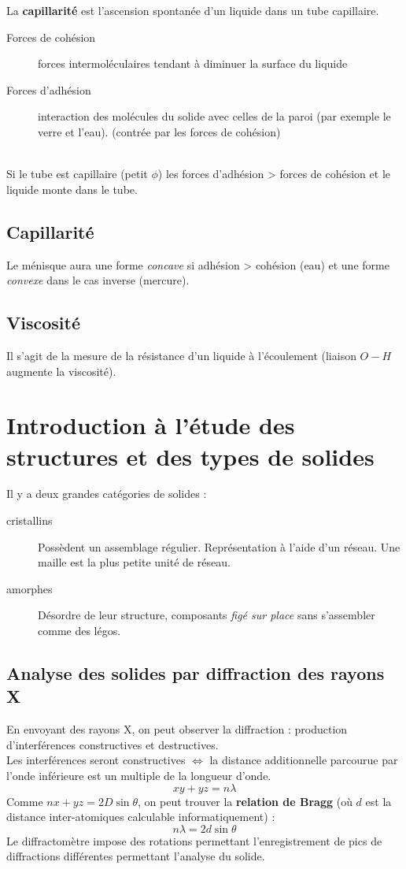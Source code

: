 \documentclass[british,french,11pt, a4paper, openany]{book}
\begin{document}
	La \textbf{capillarité} est l'ascension spontanée d'un liquide dans un tube capillaire.
	\begin{description}
		\item[Forces de cohésion] forces intermoléculaires tendant à diminuer la surface du liquide
		\item[Forces d'adhésion] interaction des molécules du solide avec celles de la paroi (par exemple le verre et l'eau). (contrée par les forces de cohésion)
	\end{description}
	\ \\
	Si le tube est capillaire (petit $\phi$) les forces d'adhésion > forces de cohésion et le liquide monte dans le tube.
	
	\subsection*{Capillarité}
	Le ménisque aura une forme \textit{concave} si adhésion > cohésion (eau) et une forme \textit{convexe} dans le cas inverse (mercure).
	
	\subsection*{Viscosité}
	Il s'agit de la mesure de la résistance d'un liquide à l'écoulement (liaison $O-H$ augmente la viscosité).
	
	\section{Introduction à l'étude des structures et des types de solides}
	Il y a deux grandes catégories de solides : 
	\begin{description}
		\item[cristallins] Possèdent un assemblage régulier. Représentation à l'aide d'un réseau. Une maille est la plus petite unité de réseau.
		\item[amorphes] Désordre de leur structure, composants \textit{figé sur place} sans s'assembler comme des légos.
	\end{description}
	
	\subsection*{Analyse des solides par diffraction des rayons X}
	En envoyant des rayons X, on peut observer la diffraction : production d'interférences constructives et destructives.\\
	Les interférences seront constructives $\Leftrightarrow$ la distance additionnelle parcourue par l'onde inférieure est un multiple de la longueur d'onde.
	$$xy + yz = n\lambda$$
	Comme $nx + yz = 2D\sin \theta$, on peut trouver la \textbf{relation de Bragg} (où $d$ est la distance inter-atomiques calculable informatiquement) :
	$$n\lambda = 2d\sin \theta$$
	Le diffractomètre impose des rotations permettant l'enregistrement de pics de diffractions différentes permettant l'analyse du solide.
	
\end{document}
